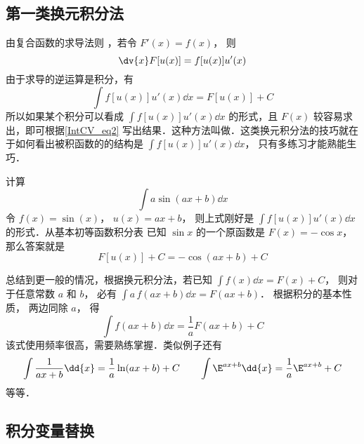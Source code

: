 
\subsection{第一类换元积分法}
由复合函数的求导法则%
，若令 $F'(x) = f(x)$， 则
\begin{equation}
\dv{x}	F[u(x)] = f[u(x)]u'(x)
\end{equation}
由于求导的逆运算是积分，有
\begin{equation}\label{IntCV_eq2}
\int f[u(x)]u'(x) \dd{x}  = F[u(x)] + C
\end{equation}
所以如果某个积分可以看成 $\int f[u(x)]u'(x) \dd{x}$ 的形式，且 $F(x)$ 较容易求出，即可根据\autoref{IntCV_eq2} 写出结果．这种方法叫做．这类换元积分法的技巧就在于如何看出被积函数的的结构是 $\int f[u(x)]u'(x) \dd{x}$， 只有多练习才能熟能生巧． 

\begin{exam}{}
计算
\begin{equation}
\int a\sin(ax + b) \dd{x}
\end{equation}
令 $f(x) = \sin(x)$， $u(x) = ax + b$， 则上式刚好是 $\int f[u(x)]u'(x) \dd{x}$ 的形式．从基本初等函数积分表 %
已知 $\sin x$ 的一个原函数是 $F(x) = -\cos x$， 那么答案就是
\begin{equation}
F[u(x)] + C =  - \cos(ax + b) + C
\end{equation}
\end{exam}

总结到更一般的情况，根据换元积分法，若已知 $\int f(x) \dd{x}  = F(x) + C$， 则对于任意常数 $a$ 和 $b$， 必有 $\int a \,f(ax + b) \dd{x} = F(ax + b)$． 根据积分的基本性质，%
两边同除 $a$， 得
\begin{equation}\label{IntCV_eq5}
\int f(ax + b) \dd{x} = \frac{1}{a} F(ax + b) + C
\end{equation}
该式使用频率很高，需要熟练掌握．类似例子还有
\begin{equation}
\int \frac{1}{ax+b} \dd{x} = \frac{1}{a}\ln (ax + b)+C  \qquad
\int \E^{ax + b} \dd{x} = \frac{1}{a} \E^{ax + b}+C
\end{equation}
等等．

\subsection{积分变量替换}

